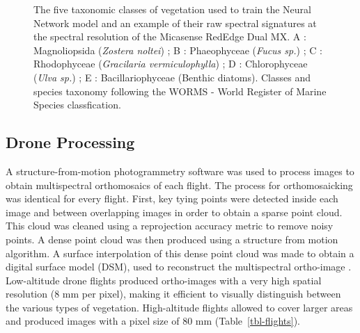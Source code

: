 \documentclass[
  number]{elsarticle}
\begin{document}
\label{cell-fig-vegetation}
\begin{figure}[H]


\caption{\label{fig-vegetation}The five taxonomic classes of vegetation
used to train the Neural Network model and an example of their raw
spectral signatures at the spectral resolution of the Micasense RedEdge
Dual MX. A : Magnoliopsida (\emph{Zostera noltei}) ; B : Phaeophyceae
(\emph{Fucus sp.}) ; C : Rhodophyceae (\emph{Gracilaria
vermiculophylla}) ; D : Chlorophyceae (\emph{Ulva sp.}) ; E :
Bacillariophyceae (Benthic diatoms). Classes and species taxonomy
following the WORMS - World Register of Marine Species classfication.}

\end{figure}%

\subsection{Drone Processing}\label{drone-processing}

A structure-from-motion photogrammetry software \citep[Agisoft
Metashape,][]{agisoft} was used to process images to obtain
multispectral orthomosaics of each flight. The process for
orthomosaicking was identical for every flight. First, key tying points
were detected inside each image and between overlapping images in order
to obtain a sparse point cloud. This cloud was cleaned using a
reprojection accuracy metric to remove noisy points. A dense point cloud
was then produced using a structure from motion algorithm. A surface
interpolation of this dense point cloud was made to obtain a digital
surface model (DSM), used to reconstruct the multispectral ortho-image
\citep{nebel2020review}. Low-altitude drone flights produced
ortho-images with a very high spatial resolution (8 mm per pixel),
making it efficient to visually distinguish between the various types of
vegetation. High-altitude flights allowed to cover larger areas and
produced images with a pixel size of 80 mm (Table~\ref{tbl-flights}).
\end{document}
